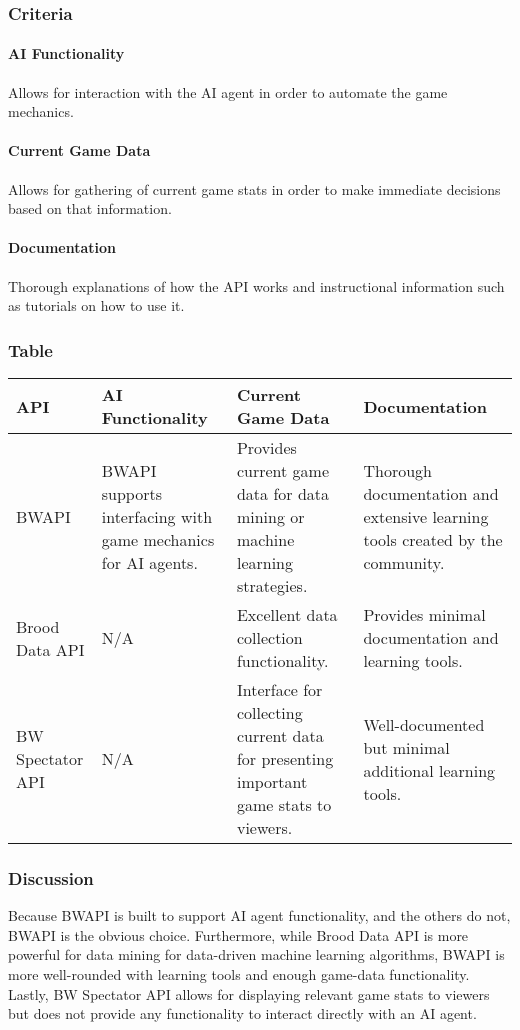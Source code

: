 \documentclass[10pt,letterpaper,onecolumn,draftclsnofoot]{IEEEtran}
\begin{document}
\subsubsection{Criteria}
	\paragraph{AI Functionality}
	Allows for interaction with the AI agent in order to automate the game mechanics.
	\paragraph{Current Game Data}
	Allows for gathering of current game stats in order to make immediate decisions based on that information.
	\paragraph{Documentation}
	Thorough explanations of how the API works and instructional information such as tutorials on how to use it.
\subsubsection{Table}
\begin{center}
	\begin{tabular}{ ||B|M|M|M|| } 
		\hline
		API & AI Functionality & Current Game Data & Documentation \\
		\hline
		BWAPI & BWAPI supports interfacing with game mechanics for AI agents. & Provides current game data for data mining or machine learning strategies. & Thorough documentation and extensive learning tools created by the community. \\ 
		\hline
		Brood Data API & N/A & Excellent data collection functionality. & Provides minimal documentation and learning tools. \\ 
		\hline
		BW Spectator API & N/A  & Interface for collecting current data for presenting important game stats to viewers. & Well-documented but minimal additional learning tools. \\ 
		\hline
	\end{tabular}
\end{center}
\subsubsection{Discussion}
	Because BWAPI is built to support AI agent functionality, and the others do not, BWAPI is the obvious choice. Furthermore, while Brood Data API is more powerful for data mining for data-driven machine learning algorithms, BWAPI is more well-rounded with learning tools and enough game-data functionality. Lastly, BW Spectator API allows for displaying relevant game stats to viewers but does not provide any functionality to interact directly with an AI agent.
\end{document}
